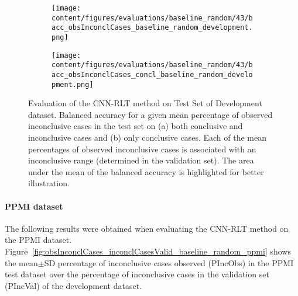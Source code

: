 \begin{figure}[ht]
  \begin{subfigure}{0.5\textwidth}
    \centering
    \texttt{[image: content/figures/evaluations/baseline\_random/43/bacc\_obsInconclCases\_baseline\_random\_development.png]}
    \subcaption{}
    \label{fig:bacc_obsInconclCases_baseline_random_development}
  \end{subfigure}
  \hfill
  \begin{subfigure}{0.5\textwidth}
    \centering
    \texttt{[image: content/figures/evaluations/baseline\_random/43/bacc\_obsInconclCases\_concl\_baseline\_random\_development.png]}
    \subcaption{}
    \label{fig:bacc_obsInconclCases_concl_baseline_random_development}
  \end{subfigure}

  \caption{Evaluation of the CNN-RLT method on Test Set of Development dataset.
  Balanced accuracy for a given mean percentage of observed inconclusive cases in the test set on 
  (a) both conclusive and inconclusive cases and (b) only conclusive cases. 
  Each of the mean percentages of observed inconclusive cases is associated with an inconclusive range (determined in the validation set). 
  The area under the mean of the balanced accuracy is highlighted for better illustration.}
  \label{fig:bacc_obsInconclCases_baseline_random_development_full}
\end{figure}





\paragraph{PPMI dataset}

The following results were obtained when evaluating the CNN-RLT method on the PPMI dataset.
Figure~\ref{fig:obsInconclCases_inconclCasesValid_baseline_random_ppmi} shows the
mean$\pm$SD percentage of inconclusive cases observed (PIncObs) in the PPMI test dataset 
over the percentage of inconclusive cases in the validation set (PIncVal) of the development dataset.

